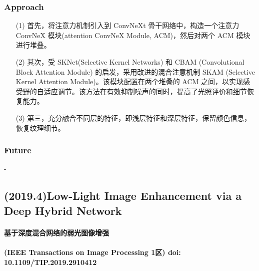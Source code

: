 \documentclass[a4paper, 10pt]{article}
\begin{document}
			
			\subsubsection{Approach}
			
			\begin{itemize}
				\item[(1)] 
				首先，将注意力机制引入到 ConvNeXt 骨干网络中，构造一个注意力 ConvNeX 模块(attention ConvNeX Module, ACM)，然后对两个 ACM 模块进行堆叠。
				
				\item[(2)]
				其次，受 SKNet(Selective Kernel Networks) 和 CBAM (Convolutional Block Attention Module) 的启发，采用改进的混合注意机制 SKAM (Selective Kernel Attention Module)。该模块配置在两个堆叠的 ACM 之间，以实现感受野的自适应调节。该方法在有效抑制噪声的同时，提高了光照评价和细节恢复能力。
				
				\item[(3)]
				第三，充分融合不同层的特征，即浅层特征和深层特征，保留颜色信息，恢复纹理细节。
			\end{itemize}				
			
			\subsubsection{Future}
			
			-
			
		\subsection{(2019.4)Low-Light Image Enhancement via a Deep Hybrid Network}
		
		\paragraph{基于深度混合网络的弱光图像增强}
		
		\paragraph{(IEEE Transactions on Image Processing 1区) doi: 10.1109/TIP.2019.2910412}
		
\end{document}
